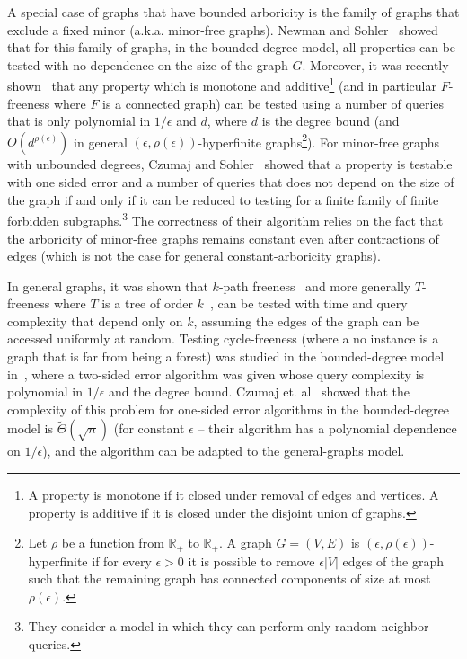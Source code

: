 \documentclass{article}
\newcommand{\eps}{\epsilon}
\newcommand{\commentt}[1]{ {}}
\begin{document}
A special case of graphs that have bounded arboricity is the family of graphs that exclude a fixed minor (a.k.a. minor-free graphs).
Newman and Sohler~\cite{NS13} showed that 
for this family of graphs, in the bounded-degree model, all properties 
can be tested with no dependence on the size of the graph $G$. Moreover, it was recently shown~\cite{SS21,LS21} that any property which is monotone and additive\footnote{A property is monotone if it closed under removal of edges and vertices. A property is 
additive if it is closed under the disjoint union of graphs.} (and in particular $F$-freeness where $F$ is a connected graph) can be tested using a number of queries that is only polynomial in $1/\eps$ and $d$, where $d$ is the degree bound (and $O(d^{\rho(\eps)})$ in general $(\eps, \rho(\eps))$-hyperfinite graphs\footnote{Let $\rho$ be a function from $\mathbb{R}_+$ to $\mathbb{R}_+$. A graph $G = (V, E)$ is $(\eps, \rho(\eps))$-hyperfinite if for every $\epsilon > 0$ it is possible to
remove $\eps |V|$ edges of the graph such that the remaining graph has connected components of size at most $\rho(\eps)$.}).
For minor-free graphs with unbounded degrees, Czumaj and Sohler~\cite{CS19} showed that a property is testable 
with one sided error and a number of queries that does not depend on the size of the graph if and only if it can be reduced to testing for a finite family of finite forbidden subgraphs.\footnote{They consider a model in which they can perform only random neighbor queries.} The correctness of their algorithm relies on the fact that the arboricity of minor-free graphs remains constant even after contractions of edges (which is not the case for general constant-arboricity graphs). 

In general graphs, it was shown that $k$-path freeness~\cite{IY18} and more generally $T$-freeness where $T$ is a tree of order $k$~\cite{EFFGLMMOORT17}, can be tested with time and query complexity that depend only on $k$, assuming the edges of the graph can be accessed uniformly at random.
Testing cycle-freeness (where a no instance is a graph that is far from being a forest) was studied in the bounded-degree model in~\cite{GR-bound}, where a two-sided error algorithm was given whose query complexity is polynomial in $1/\eps$ and the degree bound. Czumaj  et. al~\cite{CGRSSS14} showed that the complexity of this problem for one-sided error algorithms in the bounded-degree model is $\widetilde{\Theta}(\sqrt{n})$ (for constant $\eps$ -- their algorithm has a polynomial dependence on $1/\eps$), and the algorithm can be adapted to the general-graphs model.
\end{document}
